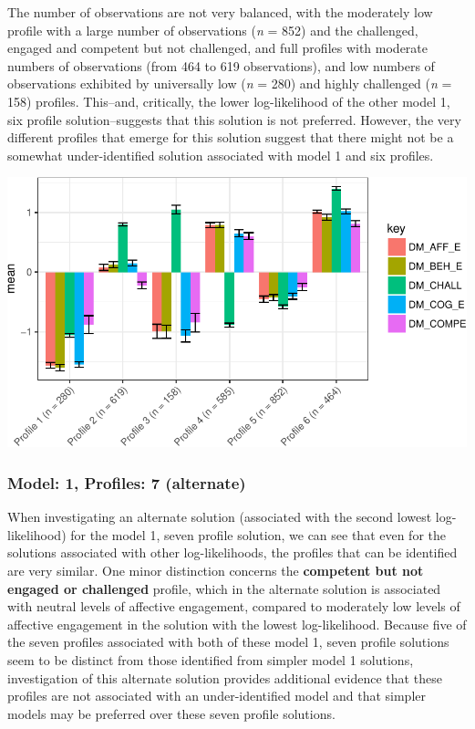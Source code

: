 \documentclass[]{msu-thesis}
\theoremstyle{definition}
\theoremstyle{definition}
\theoremstyle{definition}
\theoremstyle{remark}
\begin{document}
The number of observations are not very balanced, with the moderately
low profile with a large number of observations (\emph{n} = 852) and the
challenged, engaged and competent but not challenged, and full profiles
with moderate numbers of observations (from 464 to 619 observations),
and low numbers of observations exhibited by universally low (\emph{n} =
280) and highly challenged (\emph{n} = 158) profiles. This--and,
critically, the lower log-likelihood of the other model 1, six profile
solution--suggests that this solution is not preferred. However, the
very different profiles that emerge for this solution suggest that there
might not be a somewhat under-identified solution associated with model
1 and six profiles.

\begin{center}\includegraphics[width=0.8\linewidth]{rosenberg-dissertation_files/figure-latex/m1_6p-alt-1} \end{center}

\subsubsection{Model: 1, Profiles: 7
(alternate)}\label{model-1-profiles-7-alternate}

When investigating an alternate solution (associated with the second
lowest log-likelihood) for the model 1, seven profile solution, we can
see that even for the solutions associated with other log-likelihoods,
the profiles that can be identified are very similar. One minor
distinction concerns the \textbf{competent but not engaged or
challenged} profile, which in the alternate solution is associated with
neutral levels of affective engagement, compared to moderately low
levels of affective engagement in the solution with the lowest
log-likelihood. Because five of the seven profiles associated with both
of these model 1, seven profile solutions seem to be distinct from those
identified from simpler model 1 solutions, investigation of this
alternate solution provides additional evidence that these profiles are
not associated with an under-identified model and that simpler models
may be preferred over these seven profile solutions.
\end{document}
